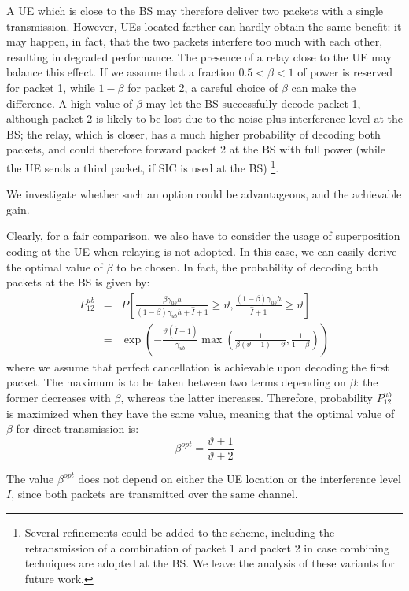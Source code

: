 \documentclass[12pt, letterpaper, onecolumn, draftcls]{IEEEtran}
\begin{document}
A UE which is close to the BS may therefore deliver two packets with a single transmission. However, UEs located farther can hardly obtain the same benefit: it may happen, in fact, that the two packets interfere too much with each other, resulting in degraded performance.
The presence of a relay close to the UE may balance this effect. If we assume that a fraction $0.5<\beta<1$ of power is reserved for packet 1, while $1-\beta$ for packet 2, a careful choice of $\beta$ can make the difference. A high value of $\beta$ may let the BS successfully decode packet 1, although packet 2 is likely to be lost due to the noise plus interference level at the BS; the relay, which is closer, has a much higher probability of decoding both packets, and could therefore forward packet 2 at the BS with full power (while the UE sends a third packet, if SIC is used at the BS)
\footnote{Several refinements could be added to the scheme, including the retransmission of a combination of packet 1 and packet 2 in case combining techniques are adopted at the BS. We leave the analysis of these variants for future work.}.

We investigate whether such an option could be advantageous, and the achievable gain.

Clearly, for a fair comparison, we also have to consider the usage of superposition coding at the UE when relaying is not adopted. In this case, we can easily derive the optimal value of $\beta$ to be chosen. In fact, the probability of decoding both packets at the BS is given by:
\begin{eqnarray}
 P_{12}^{ub} & = & P\left[\frac{\beta\gamma_{ub}h}{(1-\beta)\gamma_{ub}h+\hat{I}+1}\geq\vartheta, \frac{(1-\beta)\gamma_{ub}h}{\hat{I}+1}\geq\vartheta\right]\nonumber\\
 & = & \exp\left(-\frac{\vartheta(\hat{I}+1)}{\gamma_{ub}}\max\left(\frac{1}{\beta(\vartheta+1)-\vartheta},\frac{1}{1-\beta}\right)\right)
\end{eqnarray}
where we assume that perfect cancellation is achievable upon decoding the first packet. The maximum is to be taken between two terms depending on $\beta$: the former decreases with $\beta$, whereas the latter increases. Therefore, probability $P_{12}^{ub}$ is maximized when they have the same value, meaning that the optimal value of $\beta$ for direct transmission is:
\begin{equation}
 \beta^{opt} = \frac{\vartheta+1}{\vartheta+2}
\end{equation}

The value $\beta^{opt}$ does not depend on either the UE location or the interference level $I$, since both packets are transmitted over the same channel.
\end{document}

